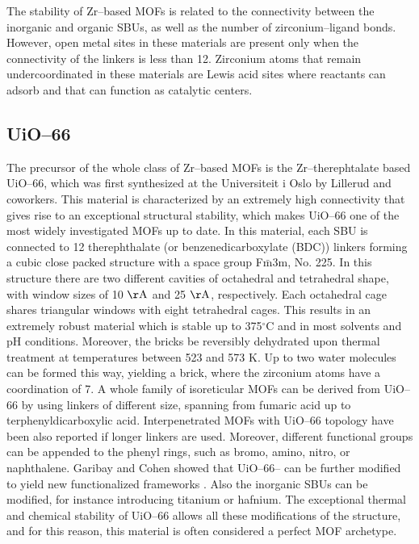 The stability of Zr--based MOFs is related to the connectivity between the inorganic and organic SBUs, as well as the number of zirconium--ligand bonds. However, open metal sites in these materials are present only when the connectivity of the linkers is less than 12. Zirconium atoms that remain undercoordinated in these materials are Lewis acid sites where reactants can adsorb and that can function as catalytic centers.

\subsection{UiO--66}
The precursor of the whole class of Zr--based MOFs is the Zr--therephtalate based UiO--66, which was first synthesized at the Universiteit i Oslo by Lillerud and coworkers\cite{cavka2008new}. This material is characterized by an extremely high connectivity that gives rise to an exceptional structural stability, which makes UiO--66 one of the most widely investigated MOFs up to date. In this material, each  SBU is connected to 12 therephthalate (or benzenedicarboxylate (BDC)) linkers forming a cubic close packed structure with a space group F$\bar{\mathrm{m}}$3m, No. 225. In this structure there are two different cavities of octahedral and tetrahedral shape, with window sizes of 10 $\mathrm{\AA}$ and 25 $\mathrm{\AA}$, respectively. Each octahedral cage shares triangular windows with eight tetrahedral cages. 
This results in an extremely robust material which is stable up to 375$^{\circ}$C and in most solvents and pH conditions. Moreover, the  bricks be reversibly dehydrated upon thermal treatment at temperatures between 523 and 573 K. Up to two water molecules can be formed this way, yielding a  brick, where the zirconium atoms have a coordination of 7\cite{valenzano2011disclosing}. 
A whole family of isoreticular MOFs can be derived from UiO--66 by using linkers of different size, spanning from fumaric acid\cite{wissmann2012modulated} up to terphenyldicarboxylic acid\cite{schaate2011modulated}. Interpenetrated MOFs with UiO--66 topology have been also reported if longer linkers are used\cite{schaate2011porous}. Moreover, different functional groups can be appended to the phenyl rings, such as bromo, amino, nitro, or naphthalene. Garibay and Cohen showed that UiO--66-- can be further modified to yield new functionalized frameworks \cite{garibay2010isoreticular}. Also the inorganic SBUs can be modified, for instance introducing titanium or hafnium\cite{kim2012postsynthetic}. The exceptional thermal and chemical stability of UiO--66 allows all these modifications of the structure, and for this reason, this material is often considered a perfect MOF archetype. 

